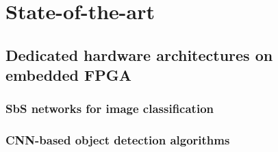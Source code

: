 \section{State-of-the-art}
\subsection{Dedicated hardware architectures on embedded FPGA}
\subsubsection{SbS networks for image classification}

\subsubsection{CNN-based object detection algorithms}

